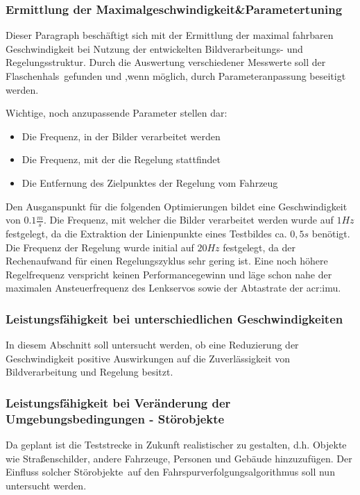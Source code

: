 \subsubsection{Ermittlung der Maximalgeschwindigkeit\&Parametertuning}
Dieser Paragraph beschäftigt sich mit der Ermittlung der maximal fahrbaren Geschwindigkeit bei Nutzung der entwickelten Bildverarbeitungs- und Regelungsstruktur. Durch die Auswertung verschiedener Messwerte soll der \glqq Flaschenhals\grqq\ gefunden und ,wenn möglich, durch Parameteranpassung beseitigt werden.

Wichtige, noch anzupassende Parameter stellen dar:
\begin{itemize}
\item Die Frequenz, in der Bilder verarbeitet werden
\item Die Frequenz, mit der die Regelung stattfindet
\item Die Entfernung des Zielpunktes der Regelung vom Fahrzeug
\end{itemize}

Den Ausganspunkt für die folgenden Optimierungen bildet eine Geschwindigkeit von \(0.1 \frac{m}{s}\). Die Frequenz, mit welcher die Bilder verarbeitet werden wurde auf \(1 Hz\) festgelegt, da die Extraktion der Linienpunkte eines Testbildes ca. \(0,5 s\) benötigt. Die Frequenz der Regelung wurde initial auf \(20 Hz\) festgelegt, da der Rechenaufwand für einen Regelungszyklus sehr gering ist. Eine noch höhere Regelfrequenz verspricht keinen Performancegewinn und läge schon nahe der maximalen Ansteuerfrequenz des Lenkservos sowie der Abtastrate der \gls{acr:imu}.




\subsubsection{Leistungsfähigkeit bei unterschiedlichen Geschwindigkeiten}
In diesem Abschnitt soll untersucht werden, ob eine Reduzierung der Geschwindigkeit positive Auswirkungen auf die Zuverlässigkeit von Bildverarbeitung und Regelung besitzt.

\subsubsection{Leistungsfähigkeit bei Veränderung der Umgebungsbedingungen - Störobjekte}
Da geplant ist die Teststrecke in Zukunft realistischer zu gestalten, d.h. Objekte wie Straßenschilder, andere Fahrzeuge, Personen und Gebäude hinzuzufügen. Der Einfluss solcher \glqq Störobjekte\grqq\ auf den Fahrspurverfolgungsalgorithmus soll nun untersucht werden.

